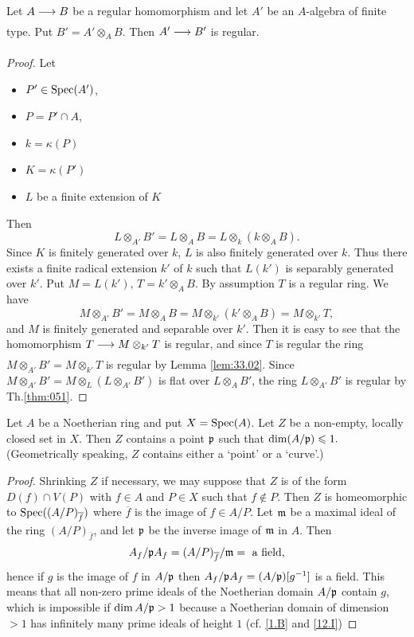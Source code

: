 \documentclass[../main]{subfiles}
\begin{document}
\begin{lemma}\label{lem:33.04}
 Let $A \varrightarrow{} B$ be a regular homomorphism and let $A'$ be an $A$-algebra of finite type. Put $B'=A' \otimes_A B$. Then $A' \varrightarrow{} B'$ is regular.
\end{lemma}
\begin{proof}
 Let 
 \begin{itemize}
     \item $P' \in \operatorname{Spec}(A')$, 
     \item $P=P' \cap A$,
     \item $k=\kappa(P)$
     \item $K=\kappa(P')$
     \item $L$ be a finite extension of $K$
 \end{itemize}
 Then \[L \otimes_{A'} B'=L \otimes_A B=L \otimes_k(k \otimes_A B).\] Since $K$ is finitely generated over $k$, $L$ is also finitely generated over $k$. Thus there exists a finite radical extension $k'$ of $k$ such that $L(k')$ is separably generated over $k'$. Put $M=L(k'), \, T=k' \otimes_A B $. By assumption $T$ is a regular ring. We have \[M \otimes_{A'} B'=M \otimes_A B=M \otimes_{k'} (k' \otimes_A B)=M \otimes_{k'} T,\] and $M$ is finitely generated and separable over $k'$. Then it is easy to see that the homomorphism $T \varrightarrow{} M \otimes_{k'} T$ is regular, and since $T$ is regular the ring $M \otimes_{A'} B'=M \otimes_{k'} T$ is regular by Lemma \ref{lem:33.02}. Since $M \otimes_{A'} B'=M \otimes_L(L \otimes_{A'} B')$ is flat over $L \otimes_A B'$, the ring $L \otimes_{A'} B'$ is regular by Th.\ref{thm:051}.
\end{proof}

\begin{parlemma}\label{lem:33.05} Let $A$ be a Noetherian ring and put $X=\operatorname{Spec}(A)$. Let $Z$ be a non-empty, locally closed set in $X .$
Then $Z$ contains a point $\mathfrak{p}$ such that $\operatorname{dim}(A / \mathfrak{p}) \leqslant 1 .$ (Geometrically speaking, $Z$ contains either a `point' or a `curve'.)
\end{parlemma}
\begin{proof}Shrinking $Z$ if necessary, we may suppose that $Z$ is
of the form \newline $D(f) \cap V(P)$ with $f \in A$ and $P \in X$ such that $f \notin P$.
Then $Z$ is homeomorphic to $\operatorname{Spec}((A / P)_{\overline{f}})$ where $\overline{f}$ is the image
of $f \in A / P$. Let $\mathfrak{m}$ be a maximal ideal of the ring $(A / P)_{\overline{f}}$,
and let $\mathfrak{p}$ be the inverse image of $\mathfrak{m}$ in $A$. Then
\[A_f / \mathfrak{p} A_f=(A / P)_{\overline{f}} / \mathfrak{m}=\text{ a field,}\]
hence if $g$ is the image of $f$ in $A / \mathfrak{p}$ then $A_f / \mathfrak{p} A_f=(A / \mathfrak{p})[g^{-1}]$
is a field. This means that all non-zero prime ideals of the
Noetherian domain $A / \mathfrak{p}$ contain $g$, which is impossible if
$\operatorname{dim} A / \mathfrak{p}>1$ because a Noetherian domain of dimension $>1$ has
infinitely many prime ideals of height $1$ (cf. \ref{1.B} and \ref{12.I})\end{proof}
\end{document}
